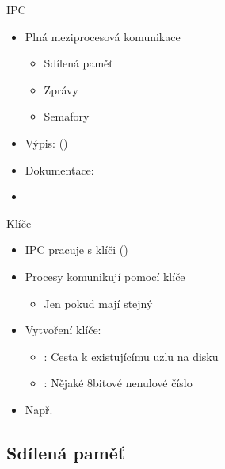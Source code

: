 
\begin{frame}{IPC}

  \begin{itemize}
    \item Plná meziprocesová komunikace
    \begin{itemize}
      \item Sdílená paměť
      \item Zprávy
      \item Semafory
    \end{itemize}

    \pause

    \item Výpis:  ()
    \item Dokumentace: 
    \item {}
  \end{itemize}

\end{frame}

\begin{frame}{Klíče}

  \begin{itemize}
    \item IPC pracuje s klíči ()
    \item Procesy komunikují pomocí klíče
    \begin{itemize}
      \item Jen pokud mají stejný
    \end{itemize}

    \pause

    \item Vytvoření klíče: 
    \begin{itemize}
      \item {}: Cesta k existujícímu uzlu na disku
      \item {}: Nějaké 8bitové nenulové číslo
    \end{itemize}

    \pause

    \item Např.\ 
  \end{itemize}

\end{frame}

\iffimuni
\subsection{Sdílená paměť}
\fi

